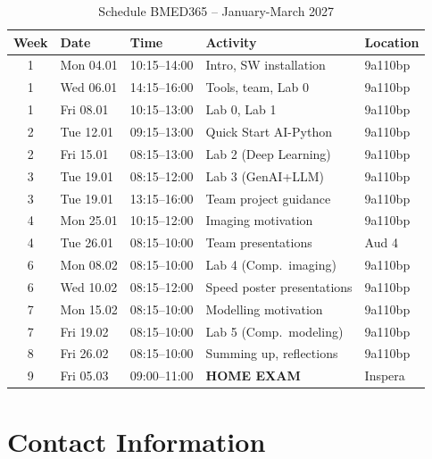 \documentclass[11pt,a4paper]{article}
\begin{document}
\begin{table}[htbp]
\centering
\caption{Schedule BMED365 -- January-March 2027}
\label{tab:schedule}
\begin{tabular}{@{}cllll@{}}
\toprule
\textbf{Week} & \textbf{Date} & \textbf{Time} & \textbf{Activity} & \textbf{Location} \\
\midrule
1 & Mon 04.01 & 10:15--14:00 & Intro, SW installation & 9a110bp \\
1 & Wed 06.01 & 14:15--16:00 & Tools, team, Lab 0 & 9a110bp \\
1 & Fri 08.01 & 10:15--13:00 & Lab 0, Lab 1 & 9a110bp \\
2 & Tue 12.01 & 09:15--13:00 & Quick Start AI-Python & 9a110bp \\
2 & Fri 15.01 & 08:15--13:00 & Lab 2 (Deep Learning) & 9a110bp \\
3 & Tue 19.01 & 08:15--12:00 & Lab 3 (GenAI+LLM) & 9a110bp \\
3 & Tue 19.01 & 13:15--16:00 & Team project guidance & 9a110bp \\
4 & Mon 25.01 & 10:15--12:00 & Imaging motivation & 9a110bp \\
4 & Tue 26.01 & 08:15--10:00 & Team presentations & Aud 4 \\
6 & Mon 08.02 & 08:15--10:00 & Lab 4 (Comp.\ imaging) & 9a110bp \\
6 & Wed 10.02 & 08:15--12:00 & Speed poster presentations & 9a110bp \\
7 & Mon 15.02 & 08:15--10:00 & Modelling motivation & 9a110bp \\
7 & Fri 19.02 & 08:15--10:00 & Lab 5 (Comp.\ modeling) & 9a110bp \\
8 & Fri 26.02 & 08:15--10:00 & Summing up, reflections & 9a110bp \\
9 & Fri 05.03 & 09:00--11:00 & \textbf{HOME EXAM} & Inspera \\
\bottomrule
\end{tabular}
\end{table}

\section{Contact Information}
\end{document}
